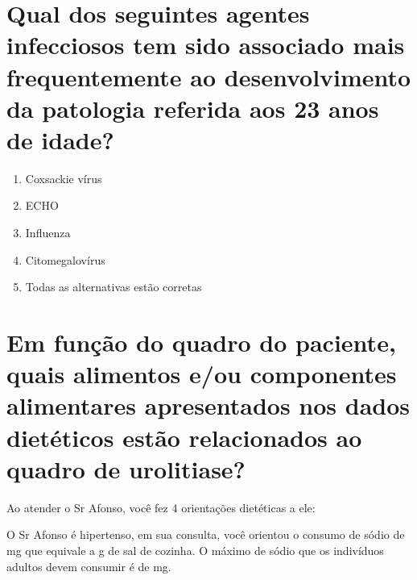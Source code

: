 \documentclass[11pt,notitlepage]{article}
\begin{document}
\section{Qual dos seguintes agentes infecciosos tem sido associado mais frequentemente ao desenvolvimento da patologia referida aos 23 anos de idade? }
\begin{multicols}{2}
	\setlength{\columnseprule}{0pt}
	\begin{enumerate}[label=(\alph*)]
		\item Coxsackie vírus
		\item ECHO
		\item Influenza
		\item Citomegalovírus
		\item Todas as alternativas estão corretas
	\end{enumerate}
\end{multicols}
\vspace{0.5cm}

\section{Em função do quadro do paciente, quais alimentos e/ou componentes alimentares apresentados nos dados dietéticos estão relacionados ao quadro de urolitiase?  }
\noindent\makebox[\linewidth]{\rule{\textwidth}{0.5pt}}
\noindent\makebox[\linewidth]{\rule{\textwidth}{0.5pt}}
\noindent\makebox[\linewidth]{\rule{\textwidth}{0.5pt}}
\vspace{0.5cm}

Ao atender o Sr Afonso, você fez 4 orientações dietéticas a ele:\\
\noindent\makebox[\linewidth]{\rule{\textwidth}{0.5pt}}
\noindent\makebox[\linewidth]{\rule{\textwidth}{0.5pt}}
\noindent\makebox[\linewidth]{\rule{\textwidth}{0.5pt}}
\noindent\makebox[\linewidth]{\rule{\textwidth}{0.5pt}}
\vspace{0.5cm}

O Sr Afonso é hipertenso, em sua consulta, você orientou o consumo de sódio de \underline{\hspace{2cm}} mg que equivale a \underline{\hspace{2cm}} g de sal de cozinha. O máximo de sódio que os indivíduos adultos devem consumir é de \underline{\hspace{2cm}} mg.
\vspace{0.5cm}
\end{document}
